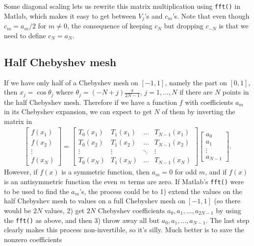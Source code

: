 Some diagonal scaling lets us rewrite this matrix multiplication using {\tt fft()} in 
Matlab, which makes it easy to get between $V_j$'s and $c_m$'s. Note that even though
$c_m = a_m/2$ for $m \neq 0$, the consequence of keeping $c_N$ but dropping $c_{-N}$
is that we need to define $c_N = a_N$.

\subsection{Half Chebyshev mesh}

If we have only half of a Chebyshev mesh on $[-1,1]$, namely the part on $[0,1]$, then
$x_j = \cos\theta_j$ where $\theta_j = (-N+j)\frac{\pi}{2N-1}$, $j = 1,...,N$ if
there are $N$ points in the half Chebyshev mesh. Therefore if we have a function $f$
with coefficients $a_m$ in its Chebyshev expansion, we can expect to get $N$ of them
by inverting the matrix in
\begin{align*}
 \begin{bmatrix} 
  f(x_1) \\ f(x_2) \\ \vdots \\ f(x_N)
 \end{bmatrix}
 = 
 \begin{bmatrix}
  T_0(x_1) & T_1(x_1) & \hdots & T_{N-1}(x_1) \\ 
  T_0(x_2) & T_1(x_2) & \hdots & T_{N-1}(x_2) \\ 
  \vdots   & \vdots   & \ddots & \vdots       \\ 
  T_0(x_N) & T_1(x_N) & \hdots & T_{N-1}(x_N)
 \end{bmatrix}
 \begin{bmatrix}
  a_0 \\ a_1 \\ \vdots \\ a_{N-1}
 \end{bmatrix}.
\end{align*}
However, if $f(x)$ is a symmetric function, then $a_m = 0$ for odd $m$, and
if $f(x)$ is an antisymmetric function the even $m$ terms are zero. 
If Matlab's {\tt fft()} were to be used to find the $a_m$'s, the process could be
to 1) extend the values on the half Chebyshev mesh to values on a full 
Chebyshev mesh on $[-1,1]$ (so there would be $2N$ values, 2) get $2N$ Chebyshev
coefficients $a_0, a_1, ... , a_{2N-1}$ by using the {\tt fft()} as above, and then 
3) throw away all but $a_0, a_1, ..., a_{N-1}$. The last step clearly makes
this process non-invertible, so it's silly. Much better is to save the nonzero coefficients
